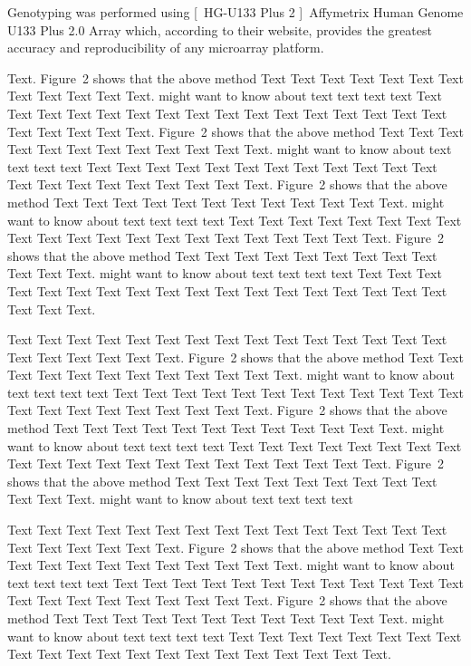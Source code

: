 \documentclass{bioinfo}
\begin{document}
\begin{methods}
Genotyping was performed using [\ HG-U133 Plus 2 ]\ Affymetrix Human Genome U133 Plus 2.0 Array which, according to their website, provides the greatest accuracy and reproducibility of any microarray platform. 

 Text\vadjust{\newpage}.
Figure~2\vphantom{\ref{fig:02}} shows that the above method  Text
Text Text Text  Text Text Text Text Text Text  Text Text.
\citealp{Boffelli03} might want to know about text text text text
Text Text Text Text Text Text Text Text Text Text Text Text Text
Text Text Text Text Text Text Text Text.
Figure~2\vphantom{\ref{fig:02}} shows that the above method  Text
Text Text Text Text Text Text Text Text Text  Text Text.
\citealp{Boffelli03} might want to know about text text text text
Text Text Text Text Text Text  Text Text Text Text Text Text Text
Text Text Text Text Text Text Text Text.
Figure~2\vphantom{\ref{fig:02}} shows that the above method  Text
Text Text Text Text Text Text Text Text Text  Text Text.
\citealp{Boffelli03} might want to know about text text text text
Text Text Text Text Text Text  Text Text Text Text Text Text Text
Text Text Text Text Text Text Text Text.
Figure~2\vphantom{\ref{fig:02}} shows that the above method Text
Text Text Text Text Text Text Text Text Text Text Text.
\citealp{Boffelli03} might want to know about text text text text
Text Text Text Text Text Text  Text Text Text Text Text Text Text
Text Text Text Text Text Text Text Text.


Text Text Text Text Text Text  Text Text Text Text Text Text Text
Text Text  Text Text Text Text Text Text.
Figure~2\vphantom{\ref{fig:02}} shows that the above method  Text
Text Text Text  Text Text Text Text Text Text  Text Text.
\citealp{Boffelli03} might want to know about  text text text text
Text Text Text Text Text Text  Text Text Text Text Text Text Text
Text Text  Text Text Text Text Text Text.
Figure~2\vphantom{\ref{fig:02}} shows that the above method  Text
Text Text Text  Text Text Text Text Text Text  Text Text.
\citealp{Boffelli03} might want to know about  text text text text
Text Text Text Text Text Text Text Text Text Text Text Text Text
Text Text  Text Text Text Text Text Text.
Figure~2\vphantom{\ref{fig:02}} shows that the above method  Text
Text Text Text  Text Text Text Text Text Text  Text Text.
\citealp{Boffelli03} might want to know about  text text text text



Text Text Text Text Text Text  Text Text Text Text Text Text Text
Text Text  Text Text Text Text Text Text.
Figure~2\vphantom{\ref{fig:02}} shows that the above method  Text
Text Text Text  Text Text Text Text Text Text  Text Text.
\citealp{Boffelli03} might want to know about  text text text text
Text Text Text Text Text Text  Text Text Text Text Text Text Text
Text Text  Text Text Text Text Text Text.
Figure~2\vphantom{\ref{fig:02}} shows that the above method  Text
Text Text Text  Text Text Text Text Text Text  Text Text.
\citealp{Boffelli03} might want to know about  text text text text
Text Text Text Text Text Text Text Text Text Text Text Text Text
Text Text  Text Text Text Text Text Text.


\end{methods}
\end{document}
